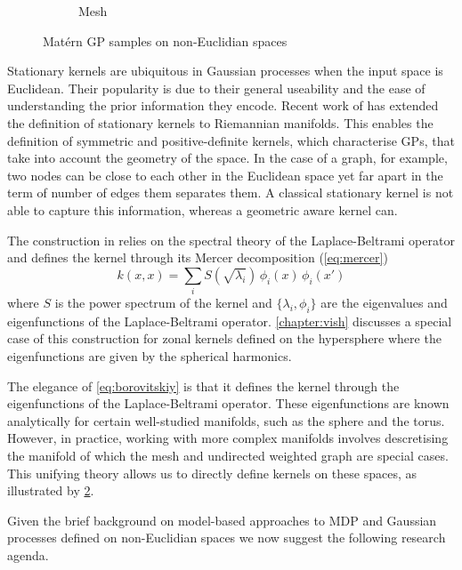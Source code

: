 \begin{figure}[tbh!]
\begin{subfigure}{0.3\textwidth}
  \caption{Mesh}
  \label{fig:mesh}
\end{subfigure}
\caption{Mat\'ern GP samples on non-Euclidian spaces}
\label{fig:gp-noneuclidian}
\end{figure}

Stationary kernels are ubiquitous in Gaussian processes when the input space is Euclidean. Their popularity is due to their general useability and the ease of understanding the prior information they encode. Recent work of \citet{Borovitskiy2020} has extended the definition of stationary kernels to Riemannian manifolds. This enables the definition of symmetric and positive-definite kernels, which characterise GPs, that take into account the geometry of the space. In the case of a graph, for example, two nodes can be close to each other in the Euclidean space yet far apart in the term of number of edges them separates them. A classical stationary kernel is not able to capture this information, whereas a geometric aware kernel can.

The construction in \citet{Borovitskiy2020} relies on the spectral theory of the Laplace-Beltrami operator and defines the kernel through its Mercer decomposition (\cref{eq:mercer})
\begin{equation}
    \label{eq:borovitskiy}
    k(x, x) = \sum_i S(\sqrt{\lambda_i})\,\phi_i(x)\,\phi_i(x')
\end{equation}
where $S$ is the power spectrum of the kernel and $\{\lambda_i, \phi_i\}$ are the eigenvalues and eigenfunctions of the Laplace-Beltrami operator. \cref{chapter:vish} discusses a special case of this construction for zonal kernels defined on the hypersphere where the eigenfunctions are given by the spherical harmonics.

The elegance of \cref{eq:borovitskiy} is that it defines the kernel through the eigenfunctions of the Laplace-Beltrami operator. These eigenfunctions are known analytically for certain well-studied manifolds, such as the sphere and the torus. However, in practice, working with more complex manifolds involves descretising the manifold of which the mesh and undirected weighted graph are special cases. This unifying theory allows us to directly define kernels on these spaces, as illustrated by \cref{fig:gp-noneuclidian}.

Given the brief background on model-based approaches to MDP and Gaussian processes defined on non-Euclidian spaces we now suggest the following research agenda. 

